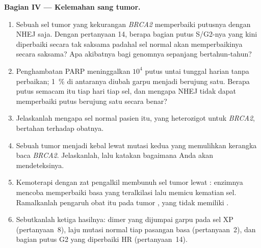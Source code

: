 \begin{problem}
\medskip
\noindent\textbf{Bagian IV --- Kelemahan sang tumor.}
\begin{enumerate}[resume]
  \item Sebuah sel tumor yang kekurangan \emph{BRCA2} memperbaiki putusnya
        dengan NHEJ saja. Dengan pertanyaan 14, berapa bagian putus S/G2-nya
        yang kini diperbaiki secara tak saksama padahal sel normal akan
        memperbaikinya secara saksama? Apa akibatnya bagi genomnya
        sepanjang bertahun-tahun?
  \item Penghambatan PARP meninggalkan $10^{4}$ putus untai tunggal harian
        tanpa perbaikan; \qty{1}{\%} di antaranya diubah garpu menjadi
         berujung satu. Berapa putus semacam itu tiap hari
        tiap sel, dan mengapa NHEJ tidak dapat memperbaiki putus berujung
        satu secara benar?
  \item Jelaskanlah mengapa sel normal pasien itu, yang heterozigot untuk
        \emph{BRCA2}, bertahan terhadap obatnya.
  \item Sebuah tumor menjadi kebal lewat mutasi kedua yang memulihkan
        kerangka baca \emph{BRCA2}. Jelaskanlah, lalu katakan bagaimana
        Anda akan mendeteksinya.
  \item Kemoterapi dengan zat pengalkil membunuh sel tumor lewat
        : enzimnya mencoba memperbaiki basa yang
        teralkilasi lalu memicu kematian sel. Ramalkanlah pengaruh
        obat itu pada tumor , yang tidak memiliki .
  \item Sebutkanlah ketiga hasilnya: dimer yang dijumpai garpu pada sel
        XP (pertanyaan~8), laju mutasi normal tiap pasangan basa
        (pertanyaan~2), dan bagian putus G2 yang diperbaiki HR
        (pertanyaan~14).
\end{enumerate}
\end{problem}

